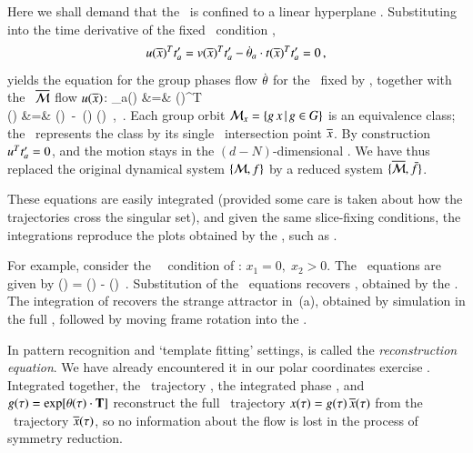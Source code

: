 \documentclass[final,number,sort&compress]{elsarticle}
\begin{document}
Here we shall demand that the \reducedsp\ is confined to a
linear hyperplane \slice. Substituting  into the
time derivative of the fixed \slice\ condition
,
\[
u(\overline{x})^T t'_{a} =
v(\overline{x})^T t'_{a} -
\dot{{\bf \theta}}_a \cdot
t(\overline{x})^T  t'_{a}
= 0
    \,,
\]
yields the equation for the group phases flow $\dot{{\bf \theta}}$
for the \slice\ fixed by \slicep, together with the
\reducedsp\ $\overline{\cal M}$  flow $u(\overline{x})$:
\bea
\dot{\gSpace}_a(\sspRed) &=& 
                       {\groupTan(\sspRed)^T \cdot \sliceTan{} }
\label{MFdtheta}\\
\velRed(\sspRed) &=& \vel(\sspRed)
                    \,-\, \dot{\gSpace}(\sspRed)  \cdot \groupTan(\sspRed)
    \,,\qquad\quad \sspRed \in \pSRed
\,.
\label{EqMotMFrame}
\eea
Each group orbit ${\cal M}_{x} = \{  g \, x \,|\, g
\in G \}$ is an equivalence class; the \mslices\ represents
the class by its single \slice\ intersection point $\overline{x}$.
By construction $u^T t'_{a} = 0$, and  the motion
stays in the $(d\!-\!N)$-dim\-ens\-ion\-al \slice. We have
thus replaced the original dynamical system $\{{\cal M},f\}$ by a
reduced system $\{\overline{\cal M},\bar{f}\}$.

These equations are easily integrated (provided some care is
taken about how the trajectories cross the singular set), and
given the same slice-fixing conditions, the integrations reproduce
the plots obtained by the \mframes, such as .

For example, consider the \cLe\ \slice\ condition of
: $x_1=0,\;x_2>0$. The \reducedsp\
equations are given by
\beq
\velRed(\sspRed) =
   \vel(\sspRed) -  \groupTan(\sspRed)
\,.
Substitution of the \cLe\ equations recovers ,
obtained by the \mframes. The integration of
\refeq{eq:rdcdCLeR} recovers the strange attractor in
\,(a), obtained by simulation in the full
\statesp, followed by moving frame rotation into the \slice.

In pattern recognition and `template fitting' settings,
 is called the {\em reconstruction equation}.
We have already encountered it in our polar coordinates
exercise . Integrated together, the
\reducedsp\ trajectory , the integrated
phase , and $g(\tau)=\exp[{\bf \theta}(\tau)
\cdot \mathbf{T}]$ reconstruct the full \statesp\ trajectory
$x(\tau)= g(\tau)\,\overline{x}(\tau)$ from the
\reducedsp\  trajectory $\overline{x}(\tau)$, so no information
about the flow is lost in the process of symmetry reduction.
\end{document}

